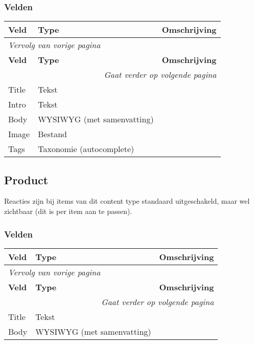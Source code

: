 \subsubsection{Velden}
  \begin{longtable}{| p{3.75cm}|p{3.75cm}|p{7.50cm}|}
  \hline
  \rowcolor{tableheader}
  \textbf{Veld} & \textbf{Type} & \textbf{Omschrijving}  \tabularnewline
  \hline
\endfirsthead
\multicolumn{3}{l}{\textit{Vervolg van vorige pagina}} \\
\hline
\rowcolor{tableheader}
  \textbf{Veld} & \textbf{Type} & \textbf{Omschrijving}  \tabularnewline
  \hline
\hline
\endhead
\multicolumn{3}{r}{\textit{Gaat verder op volgende pagina}} \\
\endfoot
\hline
\endlastfoot
  \raggedright{Title} & \raggedright{Tekst} & \raggedright{}  \tabularnewline
  \hline
  \raggedright{Intro} & \raggedright{Tekst} & \raggedright{}  \tabularnewline
  \hline
  \raggedright{Body} & \raggedright{WYSIWYG (met samenvatting)} & \raggedright{}  \tabularnewline
  \hline
  \raggedright{Image} & \raggedright{Bestand} & \raggedright{}  \tabularnewline
  \hline
  \raggedright{Tags} & \raggedright{Taxonomie (autocomplete)} & \raggedright{}  \tabularnewline
  \hline
  \end{longtable}

\subsection{Product}
\label{sec:content-product}
Reacties zijn bij items van dit content type standaard uitgeschakeld, maar wel zichtbaar (dit is per item aan te passen).

\subsubsection{Velden}
  \begin{longtable}{| p{3.75cm}|p{3.75cm}|p{7.50cm}|}
  \hline
  \rowcolor{tableheader}
  \textbf{Veld} & \textbf{Type} & \textbf{Omschrijving}  \tabularnewline
  \hline
\endfirsthead
\multicolumn{3}{l}{\textit{Vervolg van vorige pagina}} \\
\hline
\rowcolor{tableheader}
  \textbf{Veld} & \textbf{Type} & \textbf{Omschrijving}  \tabularnewline
  \hline
\hline
\endhead
\multicolumn{3}{r}{\textit{Gaat verder op volgende pagina}} \\
\endfoot
\hline
\endlastfoot
  \raggedright{Title} & \raggedright{Tekst} & \raggedright{}  \tabularnewline
  \hline
  \raggedright{Body} & \raggedright{WYSIWYG (met samenvatting)} & \raggedright{}  \tabularnewline
  \hline
  \end{longtable}


